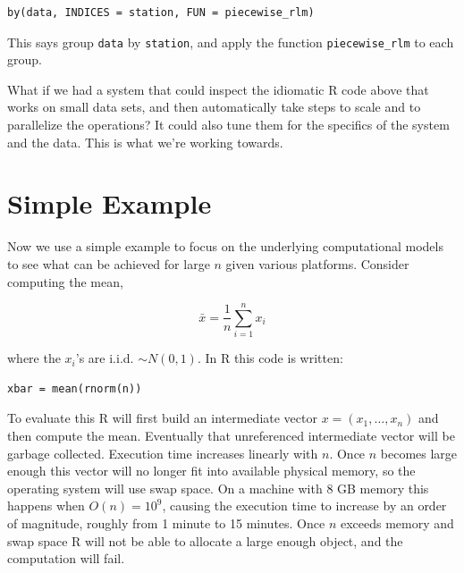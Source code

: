 \documentclass[12pt]{article}
\begin{document}
\begin{verbatim}
by(data, INDICES = station, FUN = piecewise_rlm)
\end{verbatim}

This says group \texttt{data} by \texttt{station}, and apply the
function \texttt{piecewise\_rlm} to each group.

What if we had a system that could inspect the idiomatic R code above that
works on small data sets, and then automatically take steps to scale and to
parallelize the operations? It could also tune them for the specifics of
the system and the data. This is what we're working towards.


\section{Simple Example}


Now we use a simple example to focus on the underlying computational models
to see what can be achieved for large $n$ given various platforms.
Consider computing the mean,

\begin{equation}
    \bar{x} = \frac{1}{n} \sum_{i = 1}^n x_i
\label{eq:mean}
\end{equation}

where the $x_i$'s are
i.i.d. $\sim N(0, 1)$.  In R this code is written:

\begin{verbatim}
xbar = mean(rnorm(n))
\end{verbatim}

To evaluate this R will first build an intermediate vector $x = (x_1,
\dots, x_n)$ and then compute the mean. Eventually that unreferenced
intermediate vector will be garbage collected.
Execution time increases
linearly with $n$. Once $n$ becomes large
enough this vector will no longer fit into available physical memory, so
the operating system will use swap space. On a machine with 8 GB memory
this happens when $O(n) = 10^9$, causing the execution time
to increase by an order of magnitude, roughly from 1 minute to 15
minutes. Once $n$ exceeds memory and swap space R will not be able to allocate a
large enough object, and the computation will fail.
\end{document}
